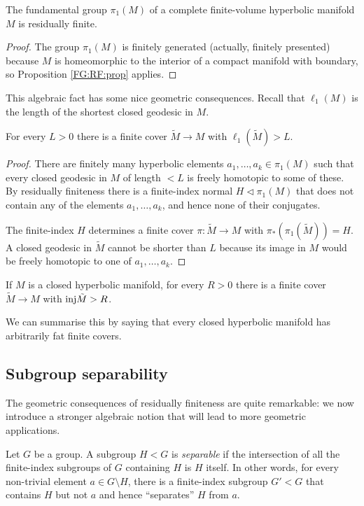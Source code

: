 \begin{prop} \label{RF:hyperbolic:prop}
The fundamental group $\pi_1(M)$ of a complete finite-volume hyperbolic manifold $M$ is residually finite.
\end{prop}
\begin{proof}
The group $\pi_1(M)$ is finitely generated (actually, finitely presented) because $M$ is homeomorphic to the interior of a compact manifold with boundary, so Proposition \ref{FG:RF:prop} applies.
\end{proof}

This algebraic fact has some nice geometric consequences. Recall that $\ell_1(M)$ is the length of the shortest closed geodesic in $M$.

\begin{cor}
For every $L>0$ there is a finite cover $\tilde M \to M$ with $\ell_1(\tilde M)>L$.
\end{cor}
\begin{proof}
There are finitely many hyperbolic elements $a_1,\ldots, a_k \in \pi_1(M)$ such that every closed geodesic in $M$ of length $<L$ is freely homotopic to some of these.
By residually finiteness there is a finite-index normal $H \triangleleft \pi_1(M)$ that does not contain any of the elements $a_1,\ldots, a_k$, and hence none of their conjugates. 

The finite-index $H$ determines a finite cover $\pi\colon \tilde M \to M$ with $\pi_*(\pi_1(\tilde M)) = H$. A closed geodesic in $\tilde M$ cannot be shorter than $L$ because its image in $M$ would be freely homotopic to one of $a_1,\ldots, a_k$.
\end{proof}

\begin{cor}
If $M$ is a closed hyperbolic manifold, for every $R>0$ there is a finite cover $\tilde M \to M$ with ${\rm inj}\tilde M > R$.
\end{cor}

We can summarise this by saying that every closed hyperbolic manifold has arbitrarily fat finite covers.

\subsection{Subgroup separability}
The geometric consequences of residually finiteness are quite remarkable: we now introduce a stronger algebraic notion that will lead to more geometric applications.

Let $G$ be a group. A subgroup $H<G$ is \emph{separable} if the intersection of all the finite-index subgroups of $G$ containing $H$ is $H$ itself. In other words, for every non-trivial element $a\in G\setminus H$, there is a finite-index subgroup $G'< G$ that contains $H$ but not $a$ and hence ``separates'' $H$ from $a$. 

